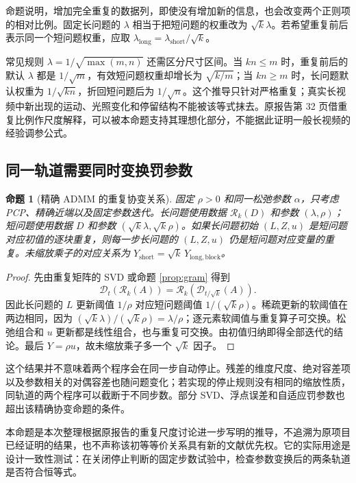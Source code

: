 \documentclass[UTF8,fontset=none,zihao=-4,a4paper]{ctexart}
\theoremstyle{plainzh}
\newtheorem{proposition}{命题}[section]
\newcommand{\SVT}{\mathcal D}
\newcommand{\rep}{\mathcal R}
\numberwithin{equation}{section}
\begin{document}
命题说明，增加完全重复的数据列，即使没有增加新的信息，也会改变两个正则项的相对比例。固定长问题的 $\lambda$ 相当于把短问题的权重改为 $\sqrt{k}\lambda$。若希望重复前后表示同一个短问题权重，应取 $\lambda_{\mathrm{long}}=\lambda_{\mathrm{short}}/\sqrt{k}$。

常见规则 $\lambda=1/\sqrt{\max(m,n)}$ 还需区分尺寸区间。当 $kn\leq m$ 时，重复前后的默认 $\lambda$ 都是 $1/\sqrt m$，有效短问题权重却增长为 $\sqrt{k/m}$；当 $kn\geq m$ 时，长问题默认权重为 $1/\sqrt{kn}$，折回短问题后为 $1/\sqrt n$。这个推导只针对严格重复；真实长视频中新出现的运动、光照变化和停留结构不能被该等式抹去。原报告第 32 页借重复比例作尺度解释，可以被本命题支持其理想化部分，不能据此证明一般长视频的经验调参公式。

\subsection{同一轨道需要同时变换罚参数}
\begin{proposition}[精确 ADMM 的重复协变关系]\label{prop:trajectory}
固定 $\rho>0$ 和同一松弛参数 $\alpha$，只考虑 PCP、精确近端以及固定参数迭代。长问题使用数据 $\rep_k(D)$ 和参数 $(\lambda,\rho)$；短问题使用数据 $D$ 和参数 $(\sqrt{k}\lambda,\sqrt{k}\rho)$。如果长问题初始 $(L,Z,u)$ 是短问题对应初值的逐块重复，则每一步长问题的 $(L,Z,u)$ 仍是短问题对应变量的重复。未缩放乘子的对应关系为 $Y_{\mathrm{short}}=\sqrt{k}\,Y_{\mathrm{long,block}}$。
\end{proposition}
\begin{proof}
先由重复矩阵的 SVD 或命题 \ref{prop:gram} 得到
\begin{equation}\label{eq:svtrepeat}
 \SVT_t(\rep_k(A))=\rep_k(\SVT_{t/\sqrt{k}}(A)).
\end{equation}
因此长问题的 $L$ 更新阈值 $1/\rho$ 对应短问题阈值 $1/(\sqrt{k}\rho)$。稀疏更新的软阈值在两边相同，因为
$(\sqrt{k}\lambda)/(\sqrt{k}\rho)=\lambda/\rho$；逐元素软阈值与重复算子可交换。松弛组合和 $u$ 更新都是线性组合，也与重复可交换。由初值归纳即得全部迭代的结论。最后 $Y=\rho u$，故未缩放乘子多一个 $\sqrt{k}$ 因子。
\end{proof}

这个结果并不意味着两个程序会在同一步自动停止。残差的维度尺度、绝对容差项以及参数相关的对偶容差也随问题变化；若实现的停止规则没有相同的缩放性质，同轨道的两个程序可以截断于不同步数。部分 SVD、浮点误差和自适应罚参数也超出该精确协变命题的条件。

本命题是本次整理根据原报告的重复尺度讨论进一步写明的推导，不追溯为原项目已经证明的结果，也不声称该初等等价关系具有新的文献优先权。它的实际用途是设计一致性测试：在关闭停止判断的固定步数试验中，检查参数变换后的两条轨道是否符合恒等式。
\end{document}
